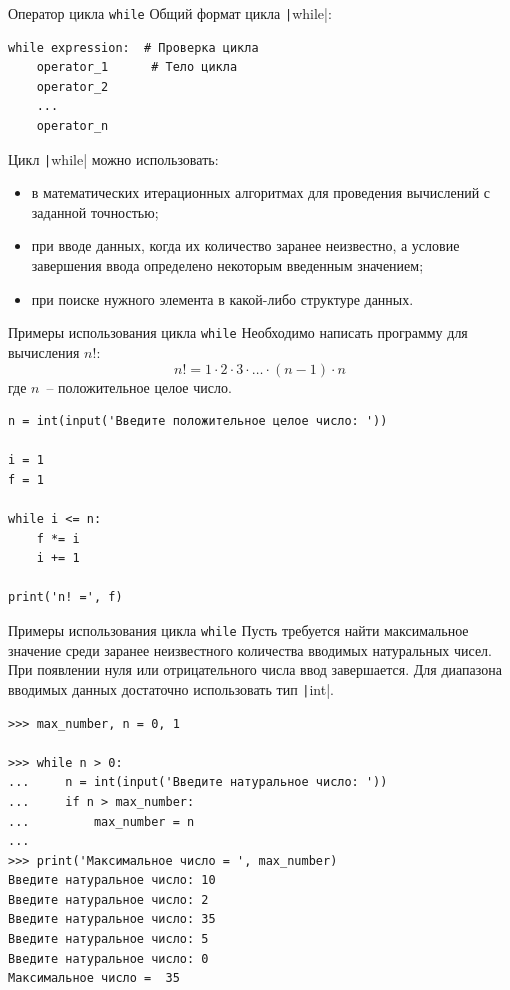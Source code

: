 \documentclass[aspectratio=169, mathserif]{beamer}	%
\begin{document}
\begin{frame}[fragile]{Оператор цикла \texttt{while}}
\scriptsize
Общий формат цикла \texttt|while|: 

\begin{verbatim}
while expression:  # Проверка цикла
    operator_1      # Тело цикла
    operator_2
    ...
    operator_n
\end{verbatim}
Цикл \texttt|while| можно использовать:
\begin{itemize}
	\item  в математических итерационных алгоритмах для проведения вычислений с заданной точностью;
	\item  при вводе данных, когда их количество заранее неизвестно, а условие завершения ввода определено некоторым введенным значением;
	\item при поиске нужного элемента в какой-либо структуре данных.
\end{itemize}
\vfill
\end{frame}


\begin{frame}[fragile]{Примеры использования цикла \texttt{while}}
\scriptsize
Необходимо написать программу для вычисления $n!$:
\begin{equation*}
	n! = 1 \cdot 2 \cdot 3 \cdot \ldots \cdot \left(n - 1\right) \cdot n
\end{equation*}
где $n$~-- положительное целое число.
\begin{verbatim}
n = int(input('Введите положительное целое число: '))

i = 1
f = 1

while i <= n:
    f *= i
    i += 1

print('n! =', f)
\end{verbatim}
\vfill
\end{frame}


\begin{frame}[fragile]{Примеры использования цикла \texttt{while}}
\scriptsize
Пусть требуется найти максимальное значение среди заранее неизвестного количества вводимых натуральных чисел. При появлении нуля или отрицательного числа ввод завершается. Для диапазона вводимых данных достаточно использовать тип \texttt|int|.
\begin{verbatim}
>>> max_number, n = 0, 1

>>> while n > 0:
...     n = int(input('Введите натуральное число: '))
...     if n > max_number:
...         max_number = n
...
>>> print('Максимальное число = ', max_number)
Введите натуральное число: 10
Введите натуральное число: 2
Введите натуральное число: 35
Введите натуральное число: 5
Введите натуральное число: 0
Максимальное число =  35
\end{verbatim}
\vfill
\end{frame}
\end{document}
